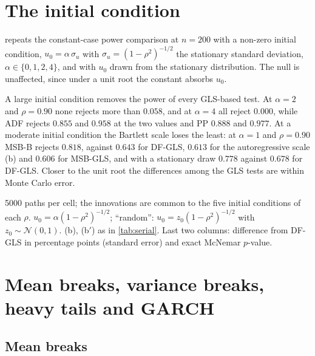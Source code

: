 \documentclass[11pt]{article}
\newcommand{\RMGLS}{MSB-B}
\begin{document}
\FloatBarrier
\section{The initial condition}\label{supp:s3}

 repeats the constant-case power comparison at $n = 200$
with a non-zero initial condition, $u_0 = \alpha\,\sigma_u$ with $\sigma_u
= (1-\rho^2)^{-1/2}$ the stationary standard deviation, $\alpha \in \{0,
1, 2, 4\}$, and with $u_0$ drawn from the stationary distribution. The
null is unaffected, since under a unit root the constant absorbs $u_0$.

A large initial condition removes the power of every GLS-based test. At
$\alpha = 2$ and $\rho = 0.90$ none rejects more than $0.058$, and at
$\alpha = 4$ all reject $0.000$, while ADF rejects $0.855$ and $0.958$ at
the two values and PP $0.888$ and $0.977$. At a moderate initial
condition the Bartlett scale loses the least: at $\alpha = 1$ and $\rho =
0.90$ \RMGLS{} rejects $0.818$, against $0.643$ for DF-GLS, $0.613$ for the
autoregressive scale (b) and $0.606$ for MSB-GLS, and with a stationary
draw $0.778$ against $0.678$ for DF-GLS. Closer to the unit root the
differences among the GLS tests are within Monte Carlo error.

\begin{table}[t]
\centering
\caption{Power with a non-zero initial condition, constant case, $n =
200$, critical values simulated under the i.i.d.\ null, $\alpha = 0.05$.}
\label{tab:initial}
\resizebox{\textwidth}{!}{%
}
\par\medskip\begin{minipage}{\textwidth}\footnotesize
5000 paths per cell; the innovations are common to the five initial
conditions of each $\rho$. $u_0 = \alpha(1-\rho^2)^{-1/2}$; ``random'':
$u_0 = z_0(1-\rho^2)^{-1/2}$ with $z_0 \sim \mathcal N(0,1)$. (b), (b$'$)
as in \cref{tab:serial}. Last two columns: difference from DF-GLS in
percentage points (standard error) and exact McNemar $p$-value.
\end{minipage}
\end{table}

\FloatBarrier
\section{Mean breaks, variance breaks, heavy tails and GARCH}\label{supp:s4}

\subsection*{Mean breaks}
\end{document}
